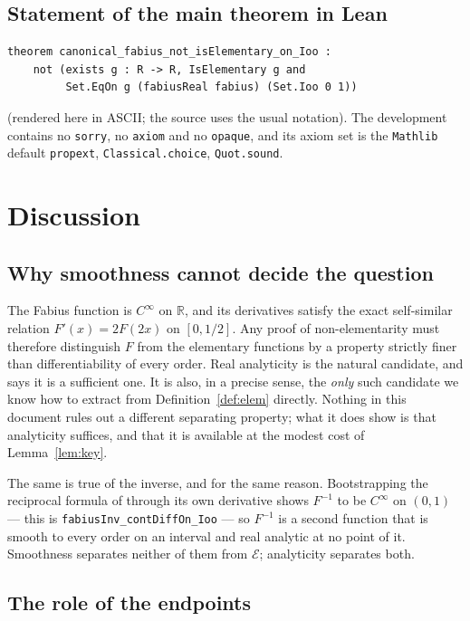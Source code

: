 \documentclass[11pt,oneside]{article}
\theoremstyle{definition}
\theoremstyle{remark}
\newcommand{\R}{\mathbb R}
\newcommand{\Elem}{\mathcal E}
\begin{document}
\subsection{Statement of the main theorem in Lean}

\begin{lstlisting}[style=pseudo]
theorem canonical_fabius_not_isElementary_on_Ioo :
    not (exists g : R -> R, IsElementary g and
         Set.EqOn g (fabiusReal fabius) (Set.Ioo 0 1))
\end{lstlisting}

\noindent (rendered here in ASCII; the source uses the usual notation).  The
development contains no \texttt{sorry}, no \texttt{axiom} and no
\texttt{opaque}, and its axiom set is the \texttt{Mathlib} default
\texttt{propext}, \texttt{Classical.choice}, \texttt{Quot.sound}.

\section{Discussion}

\subsection{Why smoothness cannot decide the question}

The Fabius function is $C^\infty$ on $\R$, and its derivatives satisfy the
exact self-similar relation $F'(x)=2F(2x)$ on $[0,1/2]$.  Any proof of
non-elementarity must therefore distinguish $F$ from the elementary functions
by a property strictly finer than differentiability of every order.  Real
analyticity is the natural candidate, and  says it is a
sufficient one.  It is also, in a precise sense, the \emph{only} such
candidate we know how to extract from Definition~\ref{def:elem} directly.  Nothing in
this document rules out a different separating property; what it does show is
that analyticity suffices, and that it is available at the modest cost of
Lemma~\ref{lem:key}.

The same is true of the inverse, and for the same reason.  Bootstrapping the
reciprocal formula of  through its own derivative shows
$F^{-1}$ to be $C^{\infty}$ on $(0,1)$ --- this is
\texttt{fabiusInv\_contDiffOn\_Ioo} --- so $F^{-1}$ is a second function that
is smooth to every order on an interval and real analytic at no point of it.
Smoothness separates neither of them from $\Elem$; analyticity separates both.

\subsection{The role of the endpoints}
\end{document}
